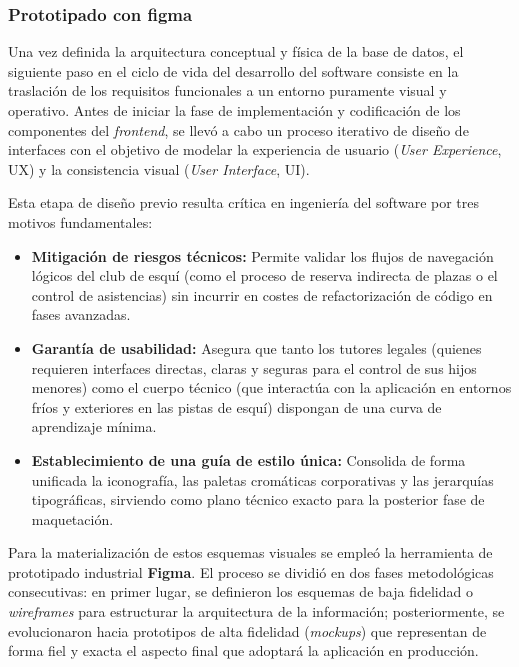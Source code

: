         \subsubsection{Prototipado con figma}
        Una vez definida la arquitectura conceptual y física de la base de datos, el siguiente paso en el ciclo de vida del desarrollo del software consiste en la traslación de los requisitos funcionales a un entorno puramente visual y operativo. Antes de iniciar la fase de implementación y codificación de los componentes del \textit{frontend}, se llevó a cabo un proceso iterativo de diseño de interfaces con el objetivo de modelar la experiencia de usuario (\textit{User Experience}, UX) y la consistencia visual (\textit{User Interface}, UI).

        Esta etapa de diseño previo resulta crítica en ingeniería del software por tres motivos fundamentales:
        \begin{itemize}
            \item \textbf{Mitigación de riesgos técnicos:} Permite validar los flujos de navegación lógicos del club de esquí (como el proceso de reserva indirecta de plazas o el control de asistencias) sin incurrir en costes de refactorización de código en fases avanzadas.
            \item \textbf{Garantía de usabilidad:} Asegura que tanto los tutores legales (quienes requieren interfaces directas, claras y seguras para el control de sus hijos menores) como el cuerpo técnico (que interactúa con la aplicación en entornos fríos y exteriores en las pistas de esquí) dispongan de una curva de aprendizaje mínima.
            \item \textbf{Establecimiento de una guía de estilo única:} Consolida de forma unificada la iconografía, las paletas cromáticas corporativas y las jerarquías tipográficas, sirviendo como plano técnico exacto para la posterior fase de maquetación.
        \end{itemize}

        Para la materialización de estos esquemas visuales se empleó la herramienta de prototipado industrial \textbf{Figma}. El proceso se dividió en dos fases metodológicas consecutivas: en primer lugar, se definieron los esquemas de baja fidelidad o \textit{wireframes} para estructurar la arquitectura de la información; posteriormente, se evolucionaron hacia prototipos de alta fidelidad (\textit{mockups}) que representan de forma fiel y exacta el aspecto final que adoptará la aplicación en producción.

